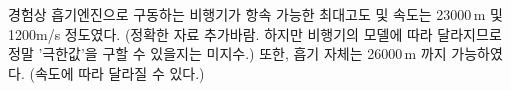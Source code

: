 \documentclass[9pt,twoside,openany]{amsbook}
\begin{document}
경험상 흡기엔진으로 구동하는 비행기가 항속 가능한 최대고도 및 속도는 23000\,m 및 1200m/s 정도였다. (정확한 자료 추가바람. 하지만 비행기의 모델에 따라 달라지므로 정말 '극한값'을 구할 수 있을지는 미지수.) 
또한, 흡기 자체는 26000\,m 까지 가능하였다. (속도에 따라 달라질 수 있다.)






\backmatter
\backpage
\end{document}
